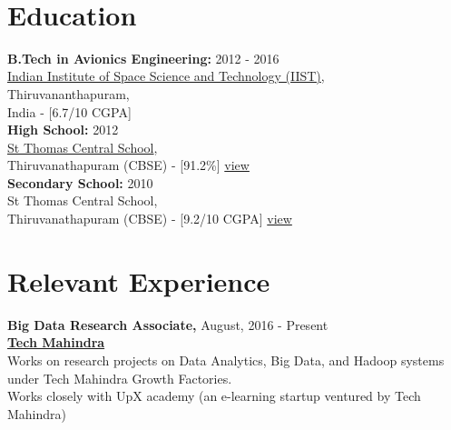 \documentclass{resume}
\begin{document}


\begin{center}
\small{
		 \
		 \
	}
\end{center}

\smallskip
\begin{multicols}{2}

\section{Education}

\textbf{B.Tech in Avionics Engineering:} \hfill 2012 - 2016 \\
\href{http://iist.ac.in/}{Indian Institute of Space Science and Technology (IIST)},\\
Thiruvananthapuram,\\
India - [6.7/10 CGPA]\\[.05in]
\textbf{High School:} \hfill 2012\\ 
\href{http://www.stthomastvm.edu.in/central/index.aspx}{St Thomas Central School},\\ Thiruvanathapuram (CBSE) - [91.2\%] \href{https://drive.google.com/open?id=0B7qfuVtugGPOZlFKYThZTjNIXzQ}{view}\\[.05in]
\textbf{Secondary School:} \hfill 2010\\  
St Thomas Central School,\\
Thiruvanathapuram (CBSE) - [9.2/10 CGPA] \href{https://drive.google.com/open?id=0B7qfuVtugGPOR0s3eFdjc183QVk}{view}


\section{Relevant Experience}
\textbf{Big Data Research Associate,} \hfill August, 2016 - Present\\
\href{https://techmahindra.com/}{\textbf{Tech Mahindra}}\\
\textbullet \enspace Works on research projects on Data Analytics, Big Data, and Hadoop systems under Tech Mahindra Growth Factories.\\
\textbullet \enspace Works closely with UpX academy (an e-learning startup ventured by Tech Mahindra) \\


\end{multicols}
\end{document}
